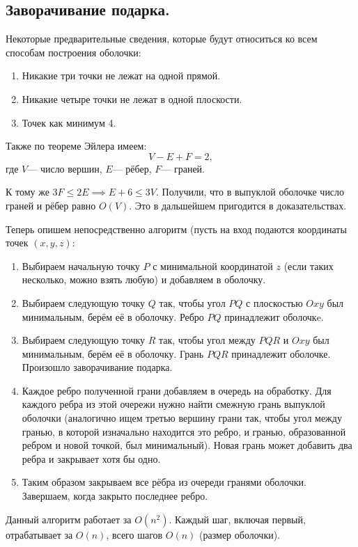 \subsection{Заворачивание подарка.}
Некоторые предварительные сведения, которые будут относиться ко всем способам построения оболочки:
\begin{enumerate}
  \item Никакие три точки не лежат на одной прямой.
  \item Никакие четыре точки не лежат в одной плоскости.
  \item Точек как минимум 4.
\end{enumerate}

Также по теореме Эйлера имеем:
\[
  V - E + F = 2
,\] где $V$--- число вершин, $E$--- рёбер, $F$--- граней.

К тому же $3F \leq 2E \implies E + 6 \leq 3V$. Получили, что в выпуклой оболочке число граней и
рёбер равно $O(V)$. Это в дальшейшем пригодится в доказательствах.

Теперь опишем непосредственно алгоритм (пусть на вход подаются координаты точек $(x, y, z)$:
\begin{enumerate}
  \item Выбираем начальную точку $P$ с минимальной координатой $z$ (если таких несколько, можно взять любую) и
    добавляем в оболочку.
  \item Выбираем следующую точку $Q$ так, чтобы угол $PQ$ с плоскостью $Oxy$ был минимальным, берём её 
    в оболочку. Ребро $PQ$ принадлежит оболочкe.
  \item Выбираем следующую точку $R$ так, чтобы угол между $PQR$ и $Oxy$ был минимальным, берём её
    в оболочку. Грань $PQR$ принадлежит оболочке. Произошло заворачивание подарка.
  \item Каждое ребро полученной грани добавляем в очередь на обработку. Для каждого ребра из этой
    очережи нужно найти смежную грань выпуклой оболочки (аналогично ищем третью вершину грани так,
    чтобы угол между гранью, в которой изначально находится это ребро, и гранью, образованной
    ребром и новой точкой, был минимальный). Новая грань может добавить два ребра и закрывает
    хотя бы одно.
  \item Таким образом закрываем все рёбра из очереди гранями оболочки. Завершаем, когда закрыто
    последнее ребро.
\end{enumerate}

\begin{remark}
  Данный алгоритм работает за $O(n^2)$. Каждый шаг, включая первый, отрабатывает за $O(n)$, всего шагов
  $O(n)$ (размер оболочки). 
\end{remark}

